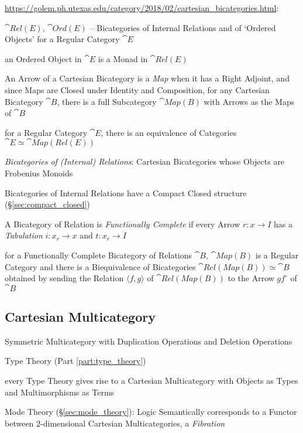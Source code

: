 \url{https://golem.ph.utexas.edu/category/2018/02/cartesian_bicategories.html}:

$\cat{Rel(E)}$, $\cat{Ord(E)}$ -- Bicategories of Internal Relations and of
`Ordered Objects' for a Regular Category $\cat{E}$

an Ordered Object in $\cat{E}$ is a Monad in $\cat{Rel(E)}$

An Arrow of a Cartesian Bicategory is a \emph{Map} when it has a Right Adjoint,
and since Maps are Closed under Identity and Composition, for any Cartesian
Bicategory $\cat{B}$, there is a full Subcategory $\cat{Map(B)}$ with Arrows as
the Maps of $\cat{B}$

for a Regular Category $\cat{E}$, there is an equivalence of Categories
$\cat{E} \simeq \cat{Map(Rel(E))}$

\emph{Bicategories of (Internal) Relations}: Cartesian Bicategories whose
Objects are Frobenius Monoids

Bicategories of Internal Relations have a Compact Closed structure
(\S\ref{sec:compact_closed})

A Bicategory of Relation is \emph{Functionally Complete} if every Arrow $r : x
\rightarrow I$ has a \emph{Tabulation} $i : x_r \rightarrow x$ and $t : x_r
\rightarrow I$

for a Functionally Complete Bicategory of Relations $\cat{B}$, $\cat{Map(B)}$
is a Regular Category and there is a Biequivalence of Bicategories
$\cat{Rel(Map(B))} \simeq \cat{B}$ obtained by sending the Relation
$\langle{f,g}\rangle$ of $\cat{Rel(Map(B))}$ to the Arrow $gf^\circ$ of
$\cat{B}$



\subsection{Cartesian Multicategory}\label{sec:cartesian_multicategory}

Symmetric Multicategory with Duplication Operations and Deletion
Operations

Type Theory (Part \ref{part:type_theory})

every Type Theory gives rise to a Cartesian Multicategory with Objects
as Types and Multimorphisms as Terms

Mode Theory (\S\ref{sec:mode_theory}): Logic Semantically corresponds
to a Functor between $2$-dimensional Cartesian Multicategories, a
\emph{Fibration}




